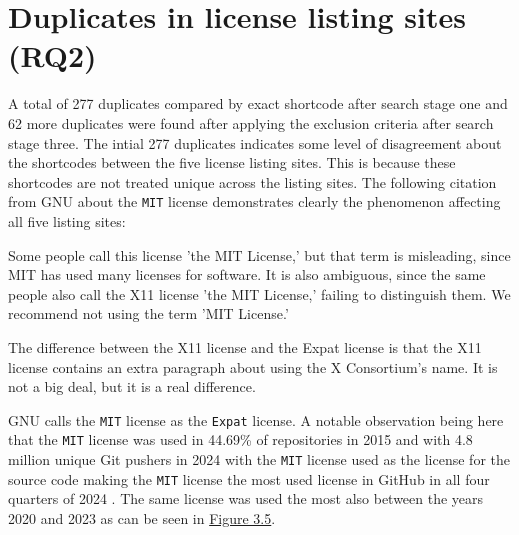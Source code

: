 \section{Duplicates in license listing sites (RQ2)}
A total of 277 duplicates compared by exact shortcode after search stage one and 62 more duplicates were found after applying the exclusion criteria after search stage three. The intial 277 duplicates indicates some level of disagreement about the shortcodes between the five license listing sites. This is because these shortcodes are not treated unique across the listing sites. The following citation from GNU \citep{gnu:licenselist} about the \texttt{MIT} license demonstrates clearly the phenomenon affecting all five listing sites:
\begin{displayquote}
  Some people call this license 'the MIT License,' but that term is misleading, since MIT has used many licenses for software. It is also ambiguous, since the same people also call the X11 license 'the MIT License,' failing to distinguish them. We recommend not using the term 'MIT License.'
\end{displayquote}
\begin{displayquote}
  The difference between the X11 license and the Expat license is that the X11 license contains an extra paragraph about using the X Consortium's name. It is not a big deal, but it is a real difference.
\end{displayquote}
GNU calls the \texttt{MIT} license as the \texttt{Expat} license. A notable observation being here that the \texttt{MIT} license was used in 44.69\% of repositories in 2015 \citep{github:licenseusage} and with 4.8 million unique Git pushers in 2024 with the \texttt{MIT} license used as the license for the source code making the \texttt{MIT} license the most used license in GitHub in all four quarters of 2024 \citep{github:innovation}. The same license was used the most also between the years 2020 and 2023 as can be seen in \hyperref[fig:3-5]{Figure 3.5}.
